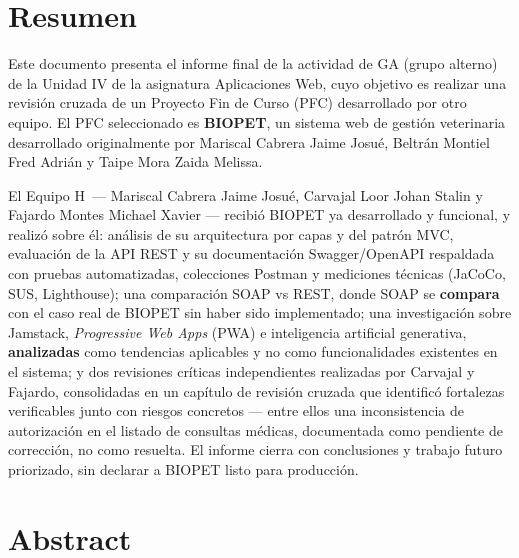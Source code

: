 \documentclass[12pt,a4paper]{report}
\newcommand{\asignatura}{Aplicaciones Web}
\newcommand{\equipoga}{Equipo H}
\begin{document}

\chapter*{Resumen}

Este documento presenta el informe final de la actividad de GA (grupo
alterno) de la Unidad IV de la asignatura \asignatura, cuyo objetivo es
realizar una revisi\'on cruzada de un Proyecto Fin de Curso (PFC)
desarrollado por otro equipo. El PFC seleccionado es \textbf{BIOPET}, un
sistema web de gesti\'on veterinaria desarrollado originalmente por
Mariscal Cabrera Jaime Josu\'e, Beltr\'an Montiel Fred Adri\'an y Taipe Mora
Zaida Melissa.

El \equipoga\ --- Mariscal Cabrera Jaime Josu\'e, Carvajal Loor Johan Stalin
y Fajardo Montes Michael Xavier --- recibi\'o BIOPET ya desarrollado y
funcional, y realiz\'o sobre \'el: an\'alisis de su arquitectura por capas y
del patr\'on MVC, evaluaci\'on de la API REST y su documentaci\'on
Swagger/OpenAPI respaldada con pruebas automatizadas, colecciones Postman y
mediciones t\'ecnicas (JaCoCo, SUS, Lighthouse); una comparaci\'on SOAP vs
REST, donde SOAP se \textbf{compara} con el caso real de BIOPET sin haber
sido implementado; una investigaci\'on sobre Jamstack, \emph{Progressive
Web Apps} (PWA) e inteligencia artificial generativa, \textbf{analizadas}
como tendencias aplicables y no como funcionalidades existentes en el
sistema; y dos revisiones cr\'iticas independientes realizadas por
Carvajal y Fajardo, consolidadas en un cap\'itulo de revisi\'on cruzada
que identific\'o
fortalezas verificables junto con riesgos concretos --- entre ellos una
inconsistencia de autorizaci\'on en el listado de consultas m\'edicas,
documentada como pendiente de correcci\'on, no como resuelta. El informe
cierra con conclusiones y trabajo futuro priorizado, sin declarar a BIOPET
listo para producci\'on.

\chapter*{Abstract}
\end{document}
